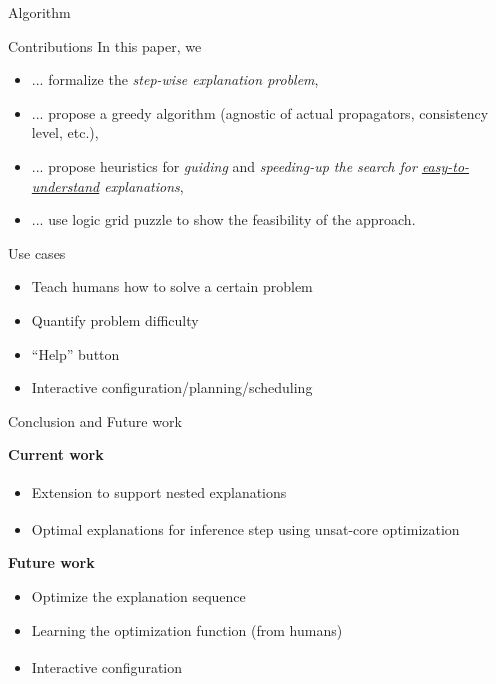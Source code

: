 \documentclass{beamer}
\begin{document}
\begin{frame}{Algorithm}
{\begin{minipage}[t]{0.40\textwidth}
\begin{figure}[h]
                \label{clues}
            \end{figure}

        \end{minipage}

    }



\end{frame}






\begin{frame}{Contributions}
    In this paper, we
    \begin{itemize}
        \item ... formalize the \emph{step-wise explanation problem},
        \item ... propose a greedy algorithm (agnostic of actual propagators, consistency level, etc.),
        \item ... propose heuristics for \emph{guiding} and \emph{speeding-up the search for \underline{easy-to-understand} explanations},
        \item ... use logic grid puzzle to show the feasibility of the approach.
    \end{itemize}
\end{frame}

\begin{frame}{Use cases}
    \begin{itemize}
        \item Teach humans how to solve a certain problem
        \item Quantify problem difficulty
        \item ``Help'' button
        \item Interactive configuration/planning/scheduling
    \end{itemize}
\end{frame}

\begin{frame}{Conclusion and Future work}

    \textbf{Current work}
    \begin{itemize}
        \item Extension to support nested explanations \textsuperscript{\cite{bogaerts2020framework}}
        \item Optimal explanations for inference step using unsat-core optimization \textsuperscript{\cite{ignatiev2013quantified}}
    \end{itemize}\pause
    \vfill
    \textbf{Future work}
    \begin{itemize}
        \item Optimize the explanation sequence
        \item Learning the optimization function (from humans)
        \item Interactive configuration \textsuperscript{\cite{fox2017explainable, van2017kb, carbonnelle2019interactive}}
    \end{itemize}
    \vfill
\end{frame}
\end{document}
